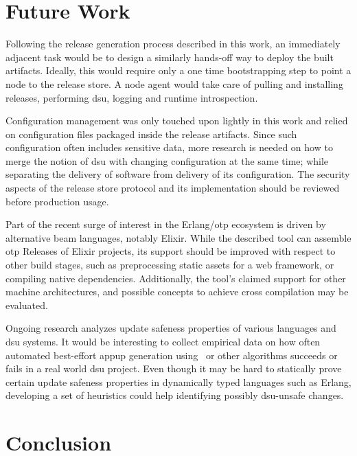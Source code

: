 \cleardoublepage
\section{Future Work}

Following the release generation process described in this work, an immediately adjacent task would be to design a similarly hands-off way to deploy the built artifacts. Ideally, this would require only a one time bootstrapping step to point a node to the release store. A node agent would take care of pulling and installing releases, performing \acrshort{dsu}, logging and runtime introspection.

Configuration management was only touched upon lightly in this work and relied on configuration files packaged inside the release artifacts. Since such configuration often includes sensitive data, more research is needed on how to merge the notion of \acrshort{dsu} with changing configuration at the same time; while separating the delivery of software from delivery of its configuration. The security aspects of the release store protocol and its implementation should be reviewed before production usage.

Part of the recent surge of interest in the Erlang/\acrshort{otp} ecosystem is driven by alternative \acrshort{beam} languages, notably Elixir. While the described tool can assemble \acrshort{otp} Releases of Elixir projects, its support should be improved with respect to other build stages, such as preprocessing static assets for a web framework, or compiling native dependencies. Additionally, the tool's claimed support for other machine architectures, and possible concepts to achieve cross compilation may be evaluated.

Ongoing research analyzes update safeness properties of various languages and \acrshort{dsu} systems. It would be interesting to collect empirical data on how often automated best-effort \acrshort{appup} generation using~\cite{rebar3appup} or other algorithms succeeds or fails in a real world \acrshort{dsu} project. Even though it may be hard to statically prove certain update safeness properties in dynamically typed languages such as Erlang, developing a set of heuristics could help identifying possibly \acrshort{dsu}-unsafe changes.

\cleardoublepage
\section{Conclusion}

